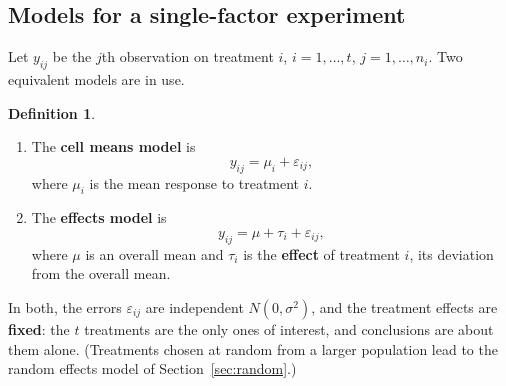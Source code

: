 \documentclass[11pt,a4paper]{article}
\numberwithin{equation}{section}
\theoremstyle{definition}
\newtheorem{defn}[thm]{Definition}
\begin{document}
\subsection{Models for a single-factor experiment}
Let $y_{ij}$ be the $j$th observation on treatment $i$, $i = 1, \dots, t$, $j = 1, \dots, n_i$. Two equivalent models are in use.

\begin{defn}
\begin{enumerate}[label=(\roman*)]
\item The \textbf{cell means model} is
\[
y_{ij} = \mu_i + \varepsilon_{ij} ,
\]
where $\mu_i$ is the mean response to treatment $i$.
\item The \textbf{effects model} is
\[
y_{ij} = \mu + \tau_i + \varepsilon_{ij} ,
\]
where $\mu$ is an overall mean and $\tau_i$ is the \textbf{effect} of treatment $i$, its deviation from the overall mean.
\end{enumerate}
In both, the errors $\varepsilon_{ij}$ are independent $N(0, \sigma^2)$, and the treatment effects are \textbf{fixed}: the $t$ treatments are the only ones of interest,
and conclusions are about them alone. (Treatments chosen at random from a larger population lead to the random effects model of
Section~\ref{sec:random}.)
\end{defn}
\end{document}
